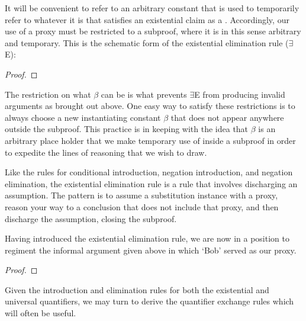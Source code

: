 It will be convenient to refer to an arbitrary constant that is used to temporarily refer to whatever it is that satisfies an existential claim as a .
Accordingly, our use of a proxy must be restricted to a subproof, where it is in this sense arbitrary and temporary.
This is the schematic form of the existential elimination rule ($\exists$E): 

\begin{proof}
	\open	
     
     
	\close
	 
\end{proof}

The restriction on what $\beta$ can be is what prevents $\exists$E from producing invalid arguments as brought out above. 
One easy way to satisfy these restrictions is to always choose a new instantiating constant $\beta$ that does not appear anywhere outside the subproof. 
This practice is in keeping with the idea that $\beta$ is an arbitrary place holder that we make temporary use of inside a subproof in order to expedite the lines of reasoning that we wish to draw.

Like the rules for conditional introduction, negation introduction, and negation elimination, the existential elimination rule is a rule that involves discharging an assumption.
The pattern is to assume a substitution instance with a proxy, reason your way to a conclusion that does not include that proxy, and then discharge the assumption, closing the subproof.

Having introduced the existential elimination rule, we are now in a position to regiment the informal argument given above in which `Bob' served as our proxy.

\begin{proof}
	 \pr{}
	 \pr{} 
	\open
		\as{}
		 
	\close
\end{proof}

Given the introduction and elimination rules for both the existential and universal quantifiers, we may turn to derive the quantifier exchange rules which will often be useful.




